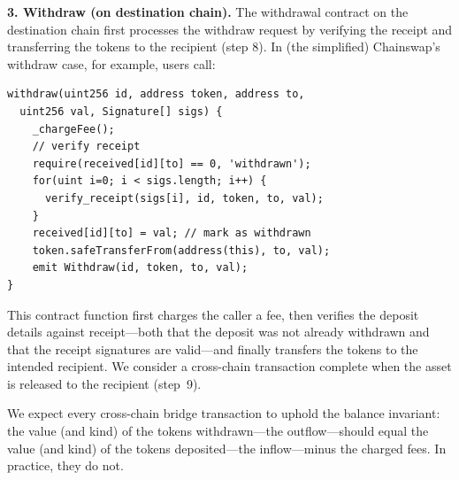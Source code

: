 \textbf{3. Withdraw (on destination chain).}
The withdrawal contract on the destination chain first processes the withdraw
request by verifying the receipt and transferring the tokens to the recipient
(step 8). In (the simplified) Chainswap's withdraw case, for example, users call:
\begin{lstlisting}
withdraw(uint256 id, address token, address to, 
  uint256 val, Signature[] sigs) {
    _chargeFee();
    // verify receipt
    require(received[id][to] == 0, 'withdrawn');
    for(uint i=0; i < sigs.length; i++) {
      verify_receipt(sigs[i], id, token, to, val);
    }
    received[id][to] = val; // mark as withdrawn
    token.safeTransferFrom(address(this), to, val);
    emit Withdraw(id, token, to, val);
}
\end{lstlisting}
This contract function first charges the caller a fee, then verifies the
deposit details against receipt---both that the deposit was not already
withdrawn and that the receipt signatures are valid---and finally transfers the
tokens to the intended recipient.  We consider a cross-chain transaction
complete when the asset is released to the recipient (step~9).

We expect every cross-chain bridge transaction to uphold the balance invariant:
the value (and kind) of the tokens withdrawn---the outflow---should equal the
value (and kind) of the tokens deposited---the inflow---minus the charged fees.
In practice, they do not.




